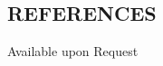 \documentclass[margin , 10pt]{res} %
\begin{document}
\begin{resume}
		
		
		\section{REFERENCES}
		
		Available upon Request
		
	

	\end{resume}
\end{document}
